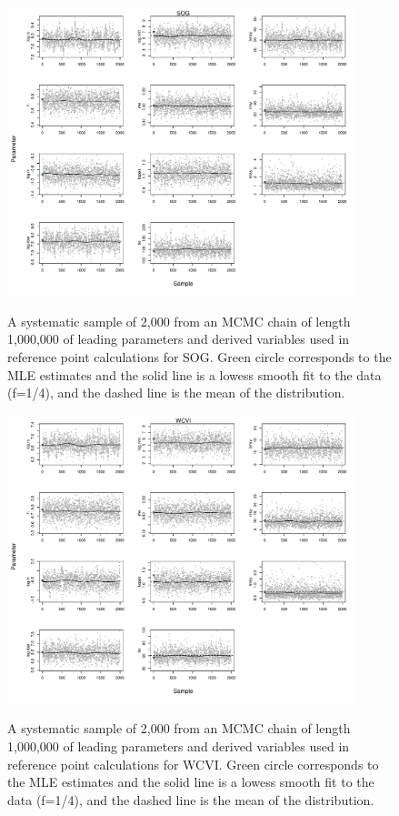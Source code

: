 \begin{figure}
	\includegraphics[width=0.9\textwidth]{../FIGS/qPriorFigs/iscam_fig_trace_SOG.pdf}\\
	\caption{A systematic sample of 2,000 from an MCMC chain of length 1,000,000 of leading parameters and derived variables used in reference point calculations for SOG. Green circle corresponds to the MLE estimates and the solid line is a lowess smooth fit to the data (f=1/4), and the dashed line is the mean of the distribution.}\label{PartII:MCMC:traceSOG}
\end{figure}

\begin{figure}
	\includegraphics[width=0.9\textwidth]{../FIGS/qPriorFigs/iscam_fig_trace_WCVI.pdf}\\
	\caption{A systematic sample of 2,000 from an MCMC chain of length 1,000,000 of leading parameters and derived variables used in reference point calculations for WCVI. Green circle corresponds to the MLE estimates and the solid line is a lowess smooth fit to the data (f=1/4), and the dashed line is the mean of the distribution.}\label{PartII:MCMC:traceWCVI}
\end{figure}


